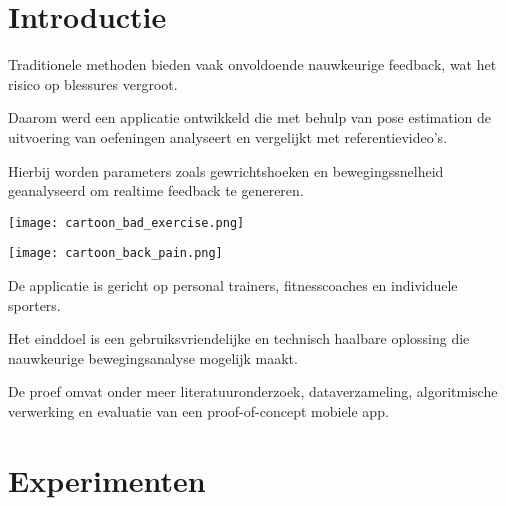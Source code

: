 \documentclass[a0,portrait]{hogent-poster}
\begin{document}
\begin{multicols}{2} %

\section{Introductie}

\noindent
\begin{minipage}[t]{0.48\linewidth}

Traditionele methoden bieden vaak onvoldoende nauwkeurige feedback, wat het risico op blessures vergroot. 

Daarom werd een applicatie ontwikkeld die met behulp van pose estimation de uitvoering van oefeningen analyseert en vergelijkt met referentievideo’s. 

Hierbij worden parameters zoals gewrichtshoeken en bewegingssnelheid geanalyseerd om realtime feedback te genereren. 

\end{minipage}
\hfill
\begin{minipage}[t]{0.48\linewidth}
\texttt{[image: cartoon\_bad\_exercise.png]}
\end{minipage}
\vspace{1em}


\noindent
\begin{minipage}[t]{0.48\linewidth}
\texttt{[image: cartoon\_back\_pain.png]}
\end{minipage}
\hfill
\begin{minipage}[t]{0.48\linewidth}

De applicatie is gericht op personal trainers, fitnesscoaches en individuele sporters. 

Het einddoel is een gebruiksvriendelijke en technisch haalbare oplossing die nauwkeurige bewegingsanalyse mogelijk maakt. 

De proef omvat onder meer literatuuronderzoek, dataverzameling, algoritmische verwerking en evaluatie van een proof-of-concept mobiele app.
\end{minipage}
\vspace{1em}

\section{Experimenten}


\end{multicols}
\end{document}
